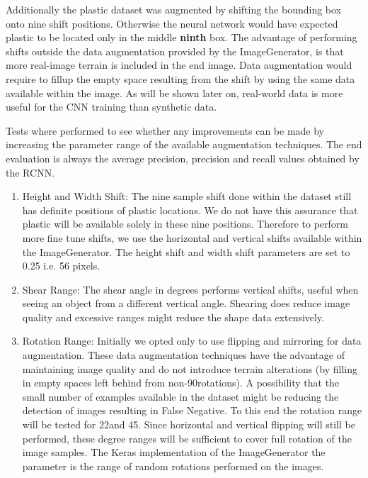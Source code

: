 \documentclass{IEEEtran}
\begin{document}
Additionally the plastic dataset was augmented by shifting the bounding box onto nine shift positions. Otherwise the neural network would have expected plastic to be located only in the middle \textbf{ninth} box. The advantage of performing shifts outside the data augmentation provided by the ImageGenerator, is that more real-image terrain is included in the end image. Data augmentation would require to fillup the empty space resulting from the shift by using the same data available within the image. As will be shown later on, real-world data is more useful for the CNN training than synthetic data.\newline

Tests where performed to see whether any improvements can be made by increasing the parameter range of the available augmentation techniques. The end evaluation is always the average precision, precision and recall values obtained by the RCNN. 

\begin{enumerate}
\item Height and Width Shift: The nine sample shift done within the dataset still has definite positions of plastic locations. We do not have this assurance that plastic will be available solely in these nine positions. Therefore to perform more fine tune shifts, we use the horizontal and vertical shifts available within the ImageGenerator. The height shift and width shift parameters are set to 0.25 i.e. 56 pixels. \newline

\item Shear Range: The shear angle in degrees performs vertical shifts, useful when seeing an object from a different vertical angle. Shearing does reduce image quality and excessive ranges might reduce the shape data extensively.

\item Rotation Range: Initially we opted only to use flipping and mirroring for data augmentation. These data augmentation techniques have the advantage of maintaining image quality and do not introduce terrain alterations (by filling in empty spaces left behind from non-90\degree rotations). A possibility that the small number of examples available in the dataset might be reducing the detection of images resulting in False Negative. To this end the rotation range will be tested for 22\degree and 45\degree. Since horizontal and vertical flipping will still be performed, these degree ranges will be sufficient to cover full rotation of the image samples. The Keras implementation of the ImageGenerator the parameter is the range of random rotations performed on the images.\newline
\end{enumerate}
\end{document}
